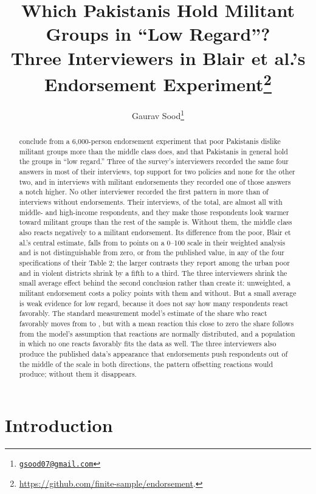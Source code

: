 \documentclass[11pt,letterpaper]{article}
\title{Which Pakistanis Hold Militant Groups in ``Low Regard''?\\[0.3em]\large Three Interviewers in Blair et al.'s Endorsement Experiment\thanks{\url{https://github.com/finite-sample/endorsement}.}}
\author{Gaurav Sood\thanks{\href{mailto:gsood07@gmail.com}{\texttt{gsood07@gmail.com}}}}
\date{}
\begin{document}
\maketitle

\begin{abstract}
\noindent \citet{blair2013poverty} conclude from a 6,000-person endorsement experiment that poor Pakistanis dislike militant groups more than the middle class does, and that Pakistanis in general hold the groups in ``low regard.'' Three of the survey's \InterviewerCount{} interviewers recorded the same four answers in most of their interviews, top support for two policies and none for the other two, and in interviews with militant endorsements they recorded one of those answers a notch higher. No other interviewer recorded the first pattern in more than \OtherBlockMax{} of interviews without endorsements. Their \SuspectInterviews{} interviews, \SuspectShare{} of the total, are almost all with middle- and high-income respondents, and they make those respondents look warmer toward militant groups than the rest of the sample is. Without them, the middle class also reacts negatively to a militant endorsement. Its difference from the poor, Blair et al.'s central estimate, falls from \BlairGapFullPoints{} to \BlairGapWithoutPoints{} points on a 0--100 scale in their weighted analysis and is not distinguishable from zero, or from the published value, in any of the four specifications of their Table 2; the larger contrasts they report among the urban poor and in violent districts shrink by a fifth to a third. The three interviewers shrink the small average effect behind the second conclusion rather than create it: unweighted, a militant endorsement costs a policy \FullATEPoints{} points with them and \PooledATEPoints{} without. But a small average is weak evidence for low regard, because it does not say how many respondents react favorably. The standard measurement model's estimate of the share who react favorably moves from \FullPrimaryShare{} to \PrimaryShare{}, but with a mean reaction this close to zero the share follows from the model's assumption that reactions are normally distributed, and a population in which no one reacts favorably fits the data as well. The three interviewers also produce the published data's appearance that endorsements push respondents out of the middle of the scale in both directions, the pattern offsetting reactions would produce; without them it disappears.
\end{abstract}

\section{Introduction}
\end{document}
